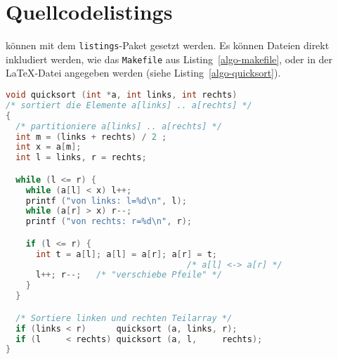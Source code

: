 
\section{Quellcodelistings}

 können mit dem \texttt{listings}-Paket gesetzt werden.
Es können Dateien direkt inkludiert werden, wie das \texttt{Makefile} aus
Listing~\ref{algo-makefile}, oder in der \LaTeX-Datei angegeben werden (siehe
Listing~\ref{algo-quicksort}).


\begin{lstlisting}[language=c,
                   frame=single,           % Ein Rahmen um den Code
                   framexleftmargin=15pt,  % Rahmen link von den Zahlen
                   style=algoBericht,
                   label={algo-quicksort},
                   captionpos=b,           % Caption unter den Code setzen
		   caption={quicksort in C}]
void quicksort (int *a, int links, int rechts)
/* sortiert die Elemente a[links] .. a[rechts] */
{
  /* partitioniere a[links] .. a[rechts] */
  int m = (links + rechts) / 2 ;
  int x = a[m];
  int l = links, r = rechts;

  while (l <= r) {
    while (a[l] < x) l++;
    printf ("von links: l=%d\n", l);
    while (a[r] > x) r--;
    printf ("von rechts: r=%d\n", r);

    if (l <= r) {
      int t = a[l]; a[l] = a[r]; a[r] = t;
                                    /* a[l] <-> a[r] */
      l++; r--;   /* "verschiebe Pfeile" */
    }
  }

  /* Sortiere linken und rechten Teilarray */
  if (links < r)      quicksort (a, links, r);
  if (l     < rechts) quicksort (a, l,     rechts);
}
\end{lstlisting}

